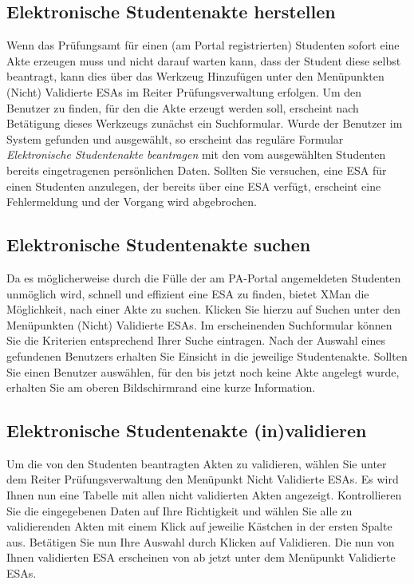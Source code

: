 \documentclass[a4paper,11pt]{article}
\newcommand{\knopf}[1]{{\sc #1}}
\begin{document}
\subsection{Elektronische Studentenakte herstellen}

Wenn das Prüfungsamt für einen (am Portal registrierten) Studenten sofort eine
Akte erzeugen muss und nicht darauf warten kann, dass der Student diese selbst
beantragt, kann dies über das Werkzeug \knopf{Hinzufügen} unter den
Menüpunkten \knopf{(Nicht) Validierte ESAs} im Reiter
\knopf{Prüfungsverwaltung} erfolgen. Um den Benutzer zu finden, für den die
Akte erzeugt werden soll, erscheint nach Betätigung dieses Werkzeugs zunächst
ein Suchformular. Wurde der Benutzer im System gefunden und ausgewählt, so
erscheint das reguläre Formular {\em Elektronische Studentenakte beantragen}
mit den vom ausgewählten Studenten bereits eingetragenen persönlichen Daten.
Sollten Sie versuchen, eine ESA für einen Studenten anzulegen, der bereits
über eine ESA verfügt, erscheint eine Fehlermeldung und der Vorgang wird
abgebrochen.

\subsection{Elektronische Studentenakte suchen}

Da es möglicherweise durch die Fülle der am PA-Portal angemeldeten Studenten
unmöglich wird, schnell und effizient eine ESA zu finden, bietet XMan die
Möglichkeit, nach einer Akte zu suchen. Klicken Sie hierzu auf \knopf{Suchen}
unter den Menüpunkten \knopf{(Nicht) Validierte ESAs}. Im erscheinenden
Suchformular können Sie die Kriterien entsprechend Ihrer Suche eintragen. Nach
der Auswahl eines gefundenen Benutzers erhalten Sie Einsicht in die jeweilige
Studentenakte. Sollten Sie einen Benutzer auswählen, für den bis jetzt noch
keine Akte angelegt wurde, erhalten Sie am oberen Bildschirmrand eine kurze
Information.

\subsection{Elektronische Studentenakte (in)validieren}

Um die von den Studenten beantragten Akten zu validieren, wählen Sie unter dem
Reiter \knopf{Prüfungsverwaltung} den Menüpunkt \knopf{Nicht Validierte ESAs}.
Es wird Ihnen nun eine Tabelle mit allen nicht validierten Akten angezeigt.
Kontrollieren Sie die eingegebenen Daten auf Ihre Richtigkeit und wählen Sie
alle zu validierenden Akten mit einem Klick auf jeweilie Kästchen in der
ersten Spalte aus. Betätigen Sie nun Ihre Auswahl durch Klicken auf
\knopf{Validieren}. Die nun von Ihnen validierten ESA erscheinen von ab jetzt
unter dem Menüpunkt \knopf{Validierte ESAs}.
\end{document}

